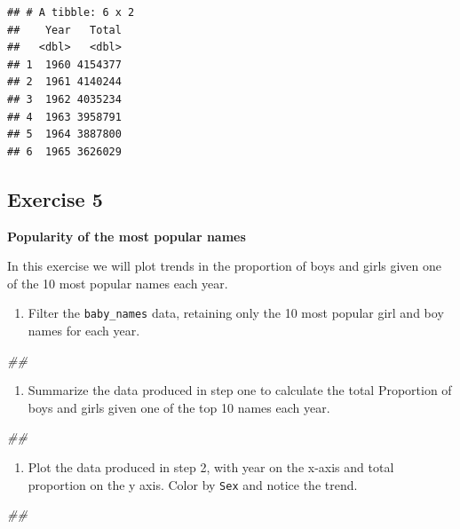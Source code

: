 \documentclass[]{book}
\newenvironment{Shaded}{\begin{snugshade}}{\end{snugshade}}
\newcommand{\CommentTok}[1]{\textcolor[rgb]{0.56,0.35,0.01}{\textit{#1}}}
\providecommand{\tightlist}{%
  \setlength{\itemsep}{0pt}\setlength{\parskip}{0pt}}
\begin{document}
\begin{verbatim}
## # A tibble: 6 x 2
##    Year   Total
##   <dbl>   <dbl>
## 1  1960 4154377
## 2  1961 4140244
## 3  1962 4035234
## 4  1963 3958791
## 5  1964 3887800
## 6  1965 3626029
\end{verbatim}

\hypertarget{exercise-5}{%
\subsection{Exercise 5}\label{exercise-5}}

\textbf{Popularity of the most popular names}

In this exercise we will plot trends in the proportion of boys and girls
given one of the 10 most popular names each year.

\begin{enumerate}
\def\labelenumi{\arabic{enumi}.}
\tightlist
\item
  Filter the \texttt{baby\_names} data, retaining only the 10 most popular girl
  and boy names for each year.
\end{enumerate}

\begin{Shaded}
\begin{Highlighting}[]
\CommentTok{##}
\end{Highlighting}
\end{Shaded}

\begin{enumerate}
\def\labelenumi{\arabic{enumi}.}
\setcounter{enumi}{1}
\tightlist
\item
  Summarize the data produced in step one to calculate the total
  Proportion of boys and girls given one of the top 10 names
  each year.
\end{enumerate}

\begin{Shaded}
\begin{Highlighting}[]
\CommentTok{##}
\end{Highlighting}
\end{Shaded}

\begin{enumerate}
\def\labelenumi{\arabic{enumi}.}
\setcounter{enumi}{2}
\tightlist
\item
  Plot the data produced in step 2, with year on the x-axis
  and total proportion on the y axis. Color by \texttt{Sex} and notice
  the trend.
\end{enumerate}

\begin{Shaded}
\begin{Highlighting}[]
\CommentTok{##}
\end{Highlighting}
\end{Shaded}
\end{document}
